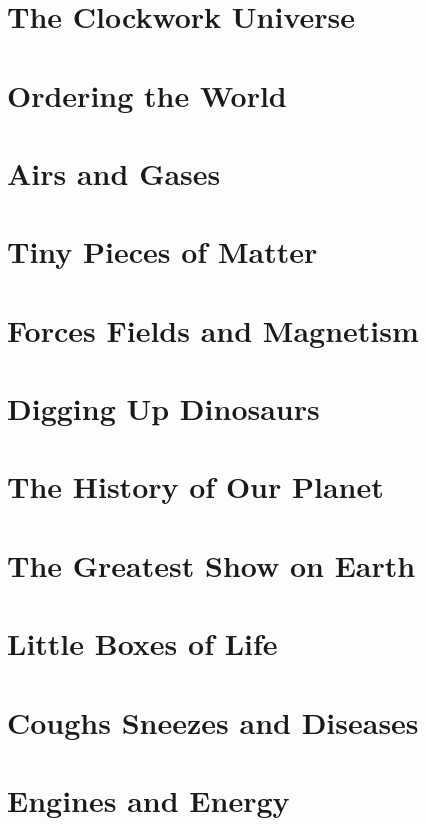 \documentclass[a4paper,12pt]{article}
\begin{document}
\section{The Clockwork Universe} %

\section{Ordering the World} %

\section{Airs and Gases} %

\section{Tiny Pieces of Matter} %

\section{Forces Fields and Magnetism} %

\section{Digging Up Dinosaurs} %

\section{The History of Our Planet} %

\section{The Greatest Show on Earth} %

\section{Little Boxes of Life} %

\section{Coughs Sneezes and Diseases} %

\section{Engines and Energy} %
\end{document}
